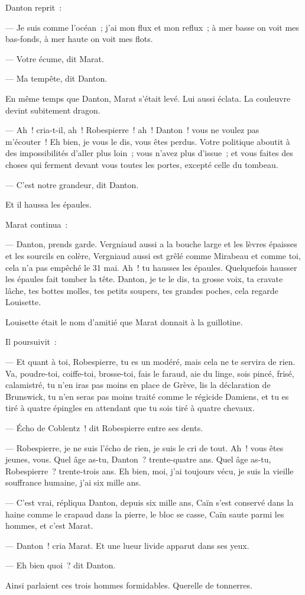 \documentclass[french,twoside]{book} %
\begin{document}
Danton reprit :\par
— Je suis comme l’océan ; j’ai mon flux et mon reflux ; à mer basse on voit mes bas-fonds, à mer haute on voit mes flots.\par
— Votre écume, dit Marat.\par
— Ma tempête, dit Danton.\par
En même temps que Danton, Marat s’était levé. Lui aussi éclata. La couleuvre devint subitement dragon.\par
— Ah ! cria-t-il, ah ! Robespierre ! ah ! Danton ! vous ne voulez pas m’écouter ! Eh bien, je vous le dis, vous êtes perdus. Votre politique aboutit à des impossibilités  d’aller plus loin ; vous n’avez plus d’issue ; et vous faites des choses qui ferment devant vous toutes les portes, excepté celle du tombeau.\par
— C’est notre grandeur, dit Danton.\par
Et il haussa les épaules.\par
Marat continua :\par
— Danton, prends garde. Vergniaud aussi a la bouche large et les lèvres épaisses et les sourcils en colère, Vergniaud aussi est grêlé comme Mirabeau et comme toi, cela n’a pas empêché le 31 mai. Ah ! tu hausses les épaules. Quelquefois hausser les épaules fait tomber la tête. Danton, je te le dis, ta grosse voix, ta cravate lâche, tes bottes molles, tes petits soupers, tes grandes poches, cela regarde Louisette.\par
Louisette était le nom d’amitié que Marat donnait à la guillotine.\par
Il poursuivit :\par
— Et quant à toi, Robespierre, tu es un modéré, mais cela ne te servira de rien. Va, poudre-toi, coiffe-toi, brosse-toi, fais le faraud, aie du linge, sois pincé, frisé, calamistré, tu n’en iras pas moins en place de Grève, lis la déclaration de Brunswick, tu n’en seras pas moins traité comme le régicide Damiens, et tu es tiré à quatre épingles en attendant que tu sois tiré à quatre chevaux.\par
— Écho de Coblentz ! dit Robespierre entre ses dents.\par
— Robespierre, je ne suis l’écho de rien, je suis le cri de tout. Ah ! vous êtes jeunes, vous. Quel âge as-tu, Danton ? trente-quatre ans. Quel âge as-tu,  Robespierre ? trente-trois ans. Eh bien, moi, j’ai toujours vécu, je suis la vieille souffrance humaine, j’ai six mille ans.\par
— C’est vrai, répliqua Danton, depuis six mille ans, Caïn s’est conservé dans la haine comme le crapaud dans la pierre, le bloc se casse, Caïn saute parmi les hommes, et c’est Marat.\par
— Danton ! cria Marat. Et une lueur livide apparut dans ses yeux.\par
— Eh bien quoi ? dit Danton.\par
Ainsi parlaient ces trois hommes formidables. Querelle de tonnerres.
\end{document}
